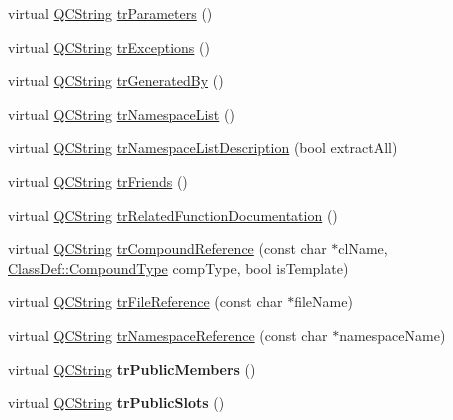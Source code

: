 \begin{DoxyCompactItemize}
virtual \hyperlink{class_q_c_string}{Q\-C\-String} \hyperlink{class_translator_catalan_a8955ee9ef9b45851d24617e2d5042038}{tr\-Parameters} ()
\item 
virtual \hyperlink{class_q_c_string}{Q\-C\-String} \hyperlink{class_translator_catalan_a97ca33ee6650968ebd891277ee0575dc}{tr\-Exceptions} ()
\item 
virtual \hyperlink{class_q_c_string}{Q\-C\-String} \hyperlink{class_translator_catalan_aa0426688896bb55b4980890f1cc6aa76}{tr\-Generated\-By} ()
\item 
virtual \hyperlink{class_q_c_string}{Q\-C\-String} \hyperlink{class_translator_catalan_ae958060c87ca1439cfe719469641a0b8}{tr\-Namespace\-List} ()
\item 
virtual \hyperlink{class_q_c_string}{Q\-C\-String} \hyperlink{class_translator_catalan_aeb5226ccdd672b54940c1705029367da}{tr\-Namespace\-List\-Description} (bool extract\-All)
\item 
virtual \hyperlink{class_q_c_string}{Q\-C\-String} \hyperlink{class_translator_catalan_a77493be94d937cfe7458c6317d792eb6}{tr\-Friends} ()
\item 
virtual \hyperlink{class_q_c_string}{Q\-C\-String} \hyperlink{class_translator_catalan_a5b5913d0d888aaca721ef5a67333bad1}{tr\-Related\-Function\-Documentation} ()
\item 
virtual \hyperlink{class_q_c_string}{Q\-C\-String} \hyperlink{class_translator_catalan_ae4c559d830de6436ef53c6ebcc3b1849}{tr\-Compound\-Reference} (const char $\ast$cl\-Name, \hyperlink{class_class_def_a768a6f0a6fd7e9087ff7971abbcc3f36}{Class\-Def\-::\-Compound\-Type} comp\-Type, bool is\-Template)
\item 
virtual \hyperlink{class_q_c_string}{Q\-C\-String} \hyperlink{class_translator_catalan_ab97b8df22dd810e2260a8cb9b06febbb}{tr\-File\-Reference} (const char $\ast$file\-Name)
\item 
virtual \hyperlink{class_q_c_string}{Q\-C\-String} \hyperlink{class_translator_catalan_a6014867d291ed13bd505e90304b3f7ba}{tr\-Namespace\-Reference} (const char $\ast$namespace\-Name)
\item 
\hypertarget{class_translator_catalan_aa766ee4ea863124dbd2c2cbfe8f615f6}{virtual \hyperlink{class_q_c_string}{Q\-C\-String} {\bfseries tr\-Public\-Members} ()}\label{class_translator_catalan_aa766ee4ea863124dbd2c2cbfe8f615f6}

\item 
\hypertarget{class_translator_catalan_a00352dfc34ae1206bd8572a9c477b8df}{virtual \hyperlink{class_q_c_string}{Q\-C\-String} {\bfseries tr\-Public\-Slots} ()}\label{class_translator_catalan_a00352dfc34ae1206bd8572a9c477b8df}


\end{DoxyCompactItemize}
